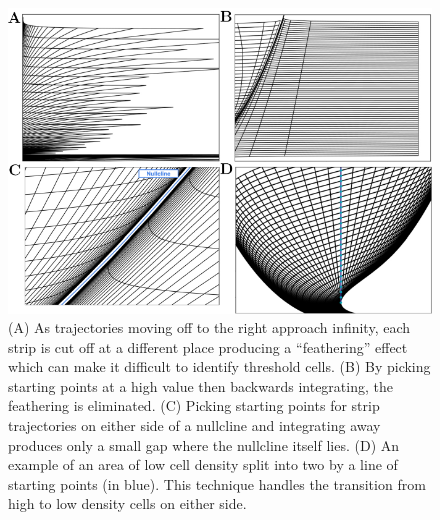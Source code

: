 \documentclass[utf8]{frontiers_suppmat} %
\begin{document}
\begin{figure}[tb]
  \centering
    \includegraphics[width=\linewidth, valign=t]{images/tips_full_figure.pdf}
  \caption{(A) As trajectories moving off to the right approach infinity, each strip is cut off at a different place producing a ``feathering'' effect which can make it difficult to identify threshold cells. (B) By picking starting points at a high value then backwards integrating, the feathering is eliminated. (C) Picking starting points for strip trajectories on either side of a nullcline and integrating away produces only a small gap where the nullcline itself lies. (D) An example of an area of low cell density split into two by a line of starting points (in blue). This technique handles the transition from high to low density cells on either side.}
  \label{fig:tips}
\end{figure}


\clearpage


\end{document}
